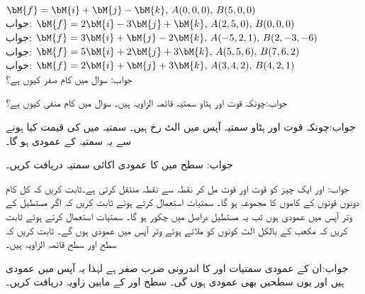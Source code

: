 \quad 
$\bM{f}=\bM{i}+\bM{j}-\bM{k},\, A(0,0,0),\, B(5,0,0)$\\
جواب:
\quad 
$\bM{f}=2\bM{i}-3\bM{j}+\bM{k},\, A(2,5,0),\, B(0,0,0)$\\
جواب:
\quad 
$\bM{f}=3\bM{i}+\bM{j}-2\bM{k},\, A(-5,2,1),\, B(2,-3,-6)$\\
جواب:
\quad 
$\bM{f}=5\bM{i}+2\bM{j}+3\bM{k},\, A(5,5,6),\, B(7,6,2)$\\
جواب:
\quad 
$\bM{f}=2\bM{i}+\bM{j}+3\bM{k},\, A(3,4,2),\, B(4,2,1)$\\
جواب:
سوال  میں کام صفر کیوں ہے؟

جواب:چونکہ قوت اور ہٹاو سمتیہ قائمہ الزاویہ ہیں۔
سوال  میں کام منفی کیوں ہے؟

جواب:چونکہ قوت اور ہٹاو سمتیہ آپس میں الٹ رخ ہیں۔
سمتیہ  میں  کی قیمت کیا ہونے سے یہ  سمتیہ  کے عمودی ہو گا۔

جواب:
 سطح میں  کا عمودی اکائی سمتیہ دریافت کریں۔

جواب: اور 
ایک چیز کو قوت  اور قوت  مل کر نقطہ  سے نقطہ  منتقل کرتی ہے۔ثابت کریں کہ کل کام دونوں قوتوں کے کاموں کا مجموعہ ہو گا۔
سمتیات استعمال کرتے ہوئے ثابت کریں کہ اگر مستطیل کے وتر آپس میں عمودی ہوں تب یہ مستطیل دراصل میں چکور ہو گا۔
سمتیات استعمال کرتے ہوئے ثابت کریں کہ مکعب کے بالکل الٹ کونوں کو ملاتے ہوئے وتر آپس میں عمودی ہوں گے۔
ثابت کریں کہ سطح  اور سطح  قائمہ الزاویہ ہیں۔

جواب:ان کے عمودی سمتیات  اور  کا اندرونی ضرب صفر ہے لہٰذا یہ آپس میں عمودی ہیں اور یوں  سطحیں بھی عمودی ہوں گی۔
سطح  اور  کے مابین زاویہ دریافت کریں۔

